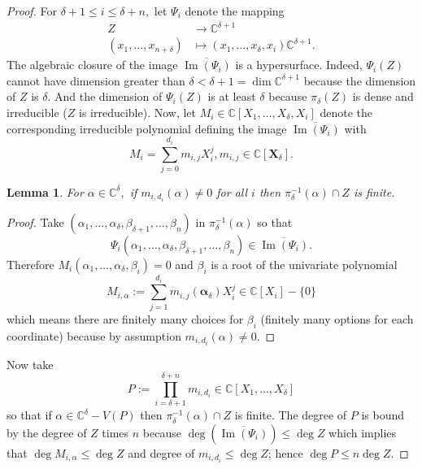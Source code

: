 \documentclass[12pt]{article}
\DeclareMathOperator{\Image}{Im}
\def\C{\mathbb{C}}
\newtheorem{lemma}[theorem]{Lemma}
\def\C{\mathbb{C}}
\begin{document}
\begin{proof}
For $\delta+1 \leq i \leq\delta + n,$ let $\Psi_i$ denote the mapping 
%
\begin{align*}
Z &\rightarrow \C^{\delta+1} \\
(x_1,\hdots,x_{n+\delta}) &\mapsto (x_1,\hdots,x_\delta,x_i) \C^{\delta+1}.
\end{align*}
%
The algebraic closure of the image $\overline{\Image(\Psi_i)}$ is a hypersurface. Indeed, $\Psi_i(Z)$ cannot have dimension greater than $\delta < \delta+1 = \dim \C^{\delta + 1}$ because the dimension of $Z$ is $\delta$. And the dimension of $\Psi_i(Z)$ is at least $\delta$ because $\pi_\delta(Z)$ is dense and irreducible ($Z$ is irreducible). Now, let $M_i \in \C[ X_1,\hdots,X_\delta,X_i]$ denote the corresponding irreducible polynomial defining the image $\overline{\Image(\Psi_i)}$ with \[
M_i = \sum_{j=0}^{d_i} m_{i,j} X_i^j, m_{i,j} \in \C[\bm X_\delta].\]
%
\begin{lemma}
For $\alpha \in \C^\delta,$ if $m_{i,d_i}(\alpha) \not = 0$ for all $i$ then $\pi_\delta^{-1}(\alpha) \cap Z$ is finite. 
\end{lemma}
%
\begin{proof}
Take $(\alpha_1,\hdots,\alpha_\delta,\beta_{\delta+1},\hdots,\beta_n)$ in $\pi_\delta^{-1}(\alpha)$ so that \[\Psi_i(\alpha_1,\hdots,\alpha_\delta,\beta_{\delta+1},\hdots,\beta_n)
\in \overline{\Image(\Psi_i)}.\]
Therefore $M_i(\alpha_1,\hdots,\alpha_\delta,\beta_i)=0$ and $\beta_i$ is a root of the univariate polynomial \[M_{i,\alpha} := \sum_{j=1}^{d_i} m_{i,j}(\bm \alpha_\delta)X_i^j \in \C[X_i]-\{0\}\] which means there are finitely many choices for $\beta_i$ (finitely many options for each coordinate) because by assumption $m_{i,d_i}(\alpha) \not = 0$. 
\end{proof}
%
\noindent
Now take \[P := \prod_{i = \delta+1}^{\delta + n} m_{i,d_i} \in \C[X_1,\hdots,X_\delta]\]
so that if $\alpha \in \C^\delta - V(P)$ then $\pi_{\delta}^{-1}(\alpha) \cap Z$ is finite.  The degree of $P$ is bound by the degree of $Z$ times $n$ because $\deg \left(\overline{\Image(\Psi_i)} \right)\leq \deg Z$ which implies that $\deg M_{i,\alpha} \leq \deg Z$ and degree of $m_{i,d_i} \leq  \deg Z$; hence $\deg P \leq n\deg Z.$
\end{proof}






\end{document}
